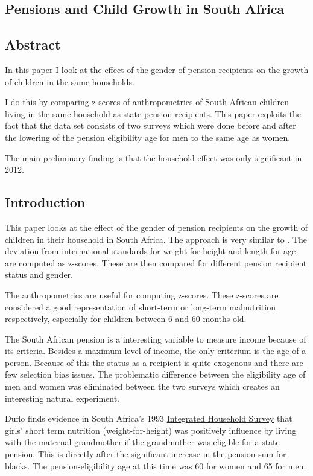 \documentclass[a4paper]{report}\usepackage{graphicx, color}
\begin{document}
\begin{refsection}
\chapter{Pensions and Child Growth in South Africa}
\label{south-africa}
\section*{Abstract}

In this paper I look at the effect of the gender of pension recipients on the growth of children in the same households.

I do this by comparing z-scores of anthropometrics of South African children living in the same household as state pension recipients. This paper exploits the fact that the data set consists of two surveys which were done before and after the lowering of the pension eligibility age for men to the same age as women.

The main preliminary finding is that the household effect was only significant in 2012.

\section{Introduction}

This paper looks at the effect of the gender of pension recipients on the growth of children in their household in South Africa. The approach
is very similar to \textcite{duflo2000, duflo2003}. The deviation from international standards \parencite{who2006child} for weight-for-height and length-for-age are computed as z-scores. These are then compared for different pension recipient status and gender.

The anthropometrics are useful for computing z-scores. These z-scores are considered a good representation of short-term or long-term malnutrition respectively, especially for children between 6 and 60 months old.

The South African pension is a interesting variable to measure income because of its criteria. Besides a maximum level of income, the only criterium is the age of a person. Because of this the status as a recipient is quite exogenous and there are few selection bias issues. The problematic difference between the eligibility age of men and women was eliminated between the two surveys which creates an interesting natural experiment.

Duflo finds evidence in South Africa's 1993 \href{http://microdata.worldbank.org/index.php/catalog/297}{Integrated Household Survey} that girls' short term nutrition (weight-for-height) was positively influence by living with the maternal grandmother if the grandmother was eligible for a state pension. This is directly after the significant increase in the pension sum for blacks. The pension-eligibility age at this time was 60 for women and 65 for men.


\end{refsection}
\end{document}
